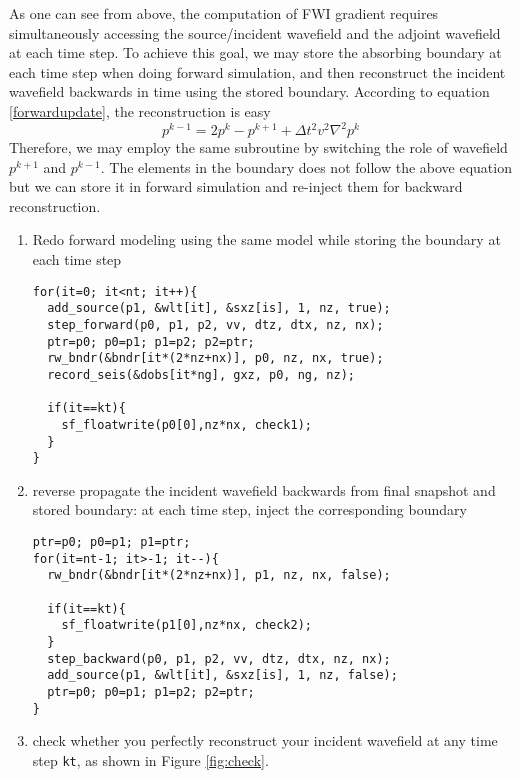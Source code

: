 As one can see from above, the computation of FWI gradient requires simultaneously accessing the source/incident wavefield and the adjoint wavefield at each time step. To achieve this goal, we may store the absorbing boundary at each time step when doing forward simulation, and then reconstruct the incident wavefield backwards in time using the stored boundary. According to equation \eqref{forwardupdate}, the reconstruction is easy 
\begin{equation}
 p^{k-1}=2p^{k}-p^{k+1}+\Delta t^2 v^2 \nabla^2 p^k  
\end{equation}
Therefore, we may employ the same subroutine by switching the role of wavefield $p^{k+1}$ and $p^{k-1}$. The elements in the boundary does not follow the above equation but we can store it in forward simulation and re-inject them for backward reconstruction. 
\begin{enumerate}
 \item Redo forward modeling using the same model while storing the boundary at each time step
\lstset{language=c,numbers=left,numberstyle=\tiny,showstringspaces=false,frame=single}
\begin{lstlisting}
for(it=0; it<nt; it++){
  add_source(p1, &wlt[it], &sxz[is], 1, nz, true); 
  step_forward(p0, p1, p2, vv, dtz, dtx, nz, nx);
  ptr=p0; p0=p1; p1=p2; p2=ptr;
  rw_bndr(&bndr[it*(2*nz+nx)], p0, nz, nx, true); 
  record_seis(&dobs[it*ng], gxz, p0, ng, nz);
  
  if(it==kt){
    sf_floatwrite(p0[0],nz*nx, check1);
  }
}
 \end{lstlisting}

 
 \item reverse propagate the incident wavefield backwards from final snapshot and stored boundary: at each time step, inject the corresponding boundary
 \begin{lstlisting}
ptr=p0; p0=p1; p1=ptr;
for(it=nt-1; it>-1; it--){
  rw_bndr(&bndr[it*(2*nz+nx)], p1, nz, nx, false);

  if(it==kt){
    sf_floatwrite(p1[0],nz*nx, check2);
  }
  step_backward(p0, p1, p2, vv, dtz, dtx, nz, nx);
  add_source(p1, &wlt[it], &sxz[is], 1, nz, false);
  ptr=p0; p0=p1; p1=p2; p2=ptr;
}
 \end{lstlisting}
 
 \item check whether you perfectly reconstruct your incident wavefield at any time step \texttt{kt}, as shown in Figure \ref{fig:check}.
 
\end{enumerate}


